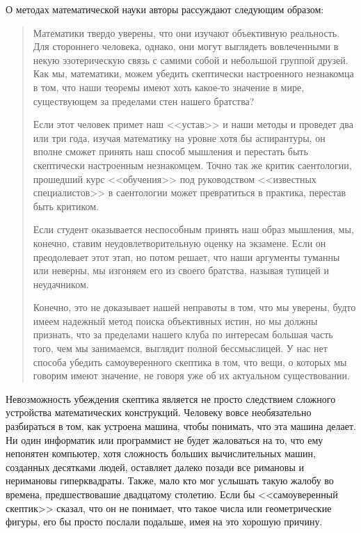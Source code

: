 О методах математической науки авторы рассуждают следующим образом:
\begin{quotation}
  Математики твердо уверены, что они изучают объективную реальность. Для стороннего человека, однако, они могут выглядеть вовлеченными в некую эзотерическую связь с самими собой и небольшой группой друзей. Как мы, математики, можем убедить скептически настроенного незнакомца в том, что наши теоремы имеют хоть какое-то значение в мире, существующем за пределами стен нашего братства?

  Если этот человек примет наш <<устав>> и наши методы и проведет два или три года, изучая математику на уровне хотя бы аспирантуры, он вполне сможет принять наш способ мышления и перестать быть скептически настроенным незнакомцем. Точно так же критик саентологии, прошедший курс <<обучения>> под руководством <<известных специалистов>> в саентологии может превратиться в практика, перестав быть критиком.

  Если студент оказывается неспособным принять наш образ мышления, мы, конечно, ставим неудовлетворительную оценку на экзамене. Если он преодолевает этот этап, но потом решает, что наши аргументы туманны или неверны, мы изгоняем его из своего братства, называя тупицей и неудачником.

  Конечно, это не доказывает нашей неправоты в том, что мы уверены, будто имеем надежный метод поиска объективных истин, но мы должны признать, что за пределами нашего клуба по интересам большая часть того, чем мы занимаемся, выглядит полной бессмыслицей. У нас нет способа убедить самоуверенного скептика в том, что вещи, о которых мы говорим имеют значение, не говоря уже об их актуальном существовании.
\end{quotation}

Невозможность убеждения скептика является не просто следствием сложного устройства математических конструкций. Человеку вовсе необязательно разбираться в том, как устроена машина, чтобы понимать, что эта машина делает. Ни один информатик или программист не будет жаловаться на то, что ему непонятен компьютер, хотя сложность больших вычислительных машин, созданных десятками людей, оставляет далеко позади все римановы и неримановы гиперквадраты. Также, мало кто мог услышать такую жалобу во времена, предшествовашие двадцатому столетию. Если бы <<самоуверенный скептик>> сказал, что он не понимает, что такое числа или геометрические фигуры, его бы просто послали подальше, имея на это хорошую причину.

